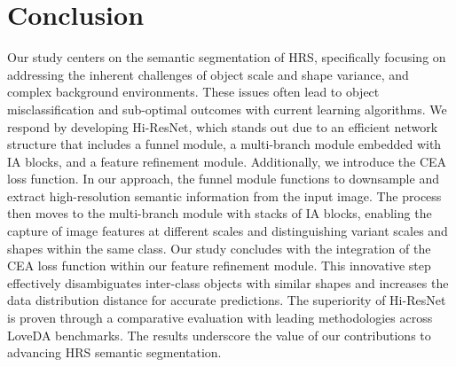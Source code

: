 \documentclass[journal]{IEEEtran}
\begin{document}
\section{Conclusion}
Our study centers on the semantic segmentation of HRS, specifically focusing on addressing the inherent challenges of object scale and shape variance, and complex background environments. These issues often lead to object misclassification and sub-optimal outcomes with current learning algorithms. We respond by developing Hi-ResNet, which stands out due to an efficient network structure that includes a funnel module, a multi-branch module embedded with IA blocks, and a feature refinement module. Additionally, we introduce the CEA loss function. In our approach, the funnel module functions to downsample and extract high-resolution semantic information from the input image. The process then moves to the multi-branch module with stacks of IA blocks, enabling the capture of image features at different scales and distinguishing variant scales and shapes within the same class. Our study concludes with the integration of the CEA loss function within our feature refinement module. This innovative step effectively disambiguates inter-class objects with similar shapes and increases the data distribution distance for accurate predictions. The superiority of Hi-ResNet is proven through a comparative evaluation with leading methodologies across LoveDA benchmarks. The results underscore the value of our contributions to advancing HRS semantic segmentation.



\end{document}
